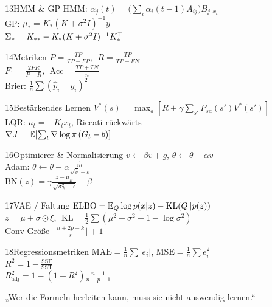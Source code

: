 \begin{hngrid}
%
\begin{hnp}[raster multicolumn=2,acc=hnorange]{13}{HMM \& GP}
HMM: $\alpha_j(t)=\bigl(\sum_i\alpha_i(t{-}1)A_{ij}\bigr)B_{j,x_t}$\\[2pt]
GP: $\mu_*=K_*(K+\sigma^2I)^{-1}y$\\[2pt]
$\Sigma_*=K_{**}-K_*(K+\sigma^2I)^{-1}K_*^{\top}$
\end{hnp}
%
\begin{hnp}[raster multicolumn=2,acc=hnpurple]{14}{Metriken}
$P=\frac{TP}{TP+FP}$, $\;R=\frac{TP}{TP+FN}$\\[2pt]
$F_1=\frac{2PR}{P+R}$, $\;\mathrm{Acc}=\frac{TP+TN}{n}$\\[2pt]
Brier: $\frac1n\sum(\hat p_i-y_i)^2$
\end{hnp}
%
\begin{hnp}[raster multicolumn=2,acc=hnteal]{15}{Bestärkendes Lernen}
$V^*(s)=\max_a[R+\gamma\sum_{s'}P_{sa}(s')V^*(s')]$\\[2pt]
LQR: $u_t=-K_tx_t$, Riccati rückwärts\\[2pt]
$\nabla J=\mathbb{E}[\sum_t\nabla\log\pi\,(G_t-b)]$
\end{hnp}
%
\begin{hnp}[raster multicolumn=2,acc=hngreen]{16}{Optimierer \& Normalisierung}
$v\leftarrow\beta v+g$, $\theta\leftarrow\theta-\alpha v$\\[2pt]
Adam: $\theta\leftarrow\theta-\alpha\frac{\hat m}{\sqrt{\hat v}+\varepsilon}$\\[2pt]
$\mathrm{BN}(z)=\gamma\frac{z-\mu_B}{\sqrt{\sigma_B^2+\varepsilon}}+\beta$
\end{hnp}
%
\begin{hnp}[raster multicolumn=2,acc=hnpurple]{17}{VAE / Faltung}
$\mathrm{ELBO}=\mathbb{E}_Q\log p(x|z)-\mathrm{KL}(Q\|p(z))$\\[2pt]
$z=\mu+\sigma\odot\xi$, $\;\mathrm{KL}=\frac12\sum(\mu^2+\sigma^2-1-\log\sigma^2)$\\[2pt]
Conv-Größe $\lfloor\frac{n+2p-k}{s}\rfloor+1$
\end{hnp}
%
\begin{hnp}[raster multicolumn=2,acc=hnrose]{18}{Regressionsmetriken}
$\mathrm{MAE}=\frac1n\sum|e_i|$, $\mathrm{MSE}=\frac1n\sum e_i^2$\\[2pt]
$R^2=1-\frac{\mathrm{SSE}}{\mathrm{SST}}$\\[2pt]
$R^2_{\mathrm{adj}}=1-(1-R^2)\frac{n-1}{n-p-1}$
\end{hnp}
%
\begin{hnbanner}[raster multicolumn=6]
„Wer die Formeln herleiten kann, muss sie nicht auswendig lernen.“
\end{hnbanner}
\end{hngrid}

